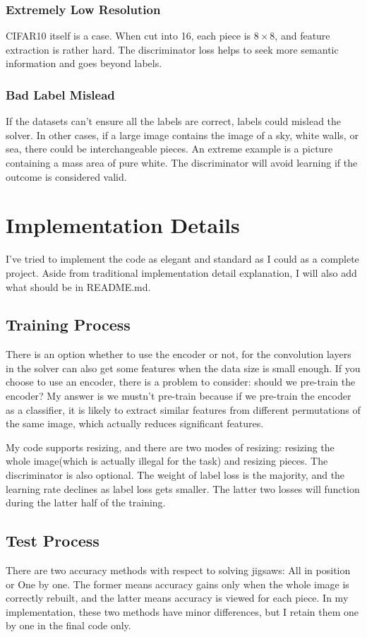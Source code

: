 \documentclass[conference]{IEEEtran}
\begin{document}
	\subsubsection{Extremely Low Resolution}
	CIFAR10 itself is a case. When cut into 16, each piece is $8\times 8$, and feature extraction is rather hard. The discriminator loss helps to seek more semantic information and goes beyond labels.
	\subsubsection{Bad Label Mislead}
	If the datasets can't ensure all the labels are correct, labels could mislead the solver. In other cases, if a large image contains the image of a sky, white walls, or sea, there could be interchangeable pieces. An extreme example is a picture containing a mass area of pure white. The discriminator will avoid learning if the outcome is considered valid. 
	\section{\textbf{Implementation Details}}
	I've tried to implement the code as elegant and standard as I could as a complete project. Aside from traditional implementation detail explanation, I will also add what should be in README.md. 
	\subsection{Training Process}
	There is an option whether to use the encoder or not, for the convolution layers in the solver can also get some features when the data size is small enough. If you choose to use an encoder, there is a problem to consider: should we pre-train the encoder? My answer is we mustn't pre-train because if we pre-train the encoder as a classifier, it is likely to extract similar features from different permutations of the same image, which actually reduces significant features. 
	
	My code supports resizing, and there are two modes of resizing: resizing the whole image(which is actually illegal for the task) and resizing pieces. The discriminator is also optional. The weight of label loss is the majority, and the learning rate declines as label loss gets smaller. The latter two losses will function during the latter half of the training. 
	\subsection{Test Process}
	There are two accuracy methods with respect to solving jigsaws: All in position or One by one. The former means accuracy gains only when the whole image is correctly rebuilt, and the latter means accuracy is viewed for each piece. In my implementation, these two methods have minor differences, but I retain them one by one in the final code only. 
\end{document}
